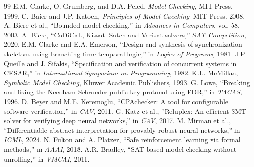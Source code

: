 \documentclass{llncs}
\begin{document}
\begin{thebibliography}{99}
 E.M. Clarke, O. Grumberg, and D.A. Peled, \textit{Model Checking}, MIT Press, 1999.
 C. Baier and J.P. Katoen, \textit{Principles of Model Checking}, MIT Press, 2008.
 A. Biere et al., ``Bounded model checking,'' in \textit{Advances in Computers}, vol. 58, 2003.
 A. Biere, ``CaDiCaL, Kissat, Satch and Varisat solvers,'' \textit{SAT Competition}, 2020.
 E.M. Clarke and E.A. Emerson, ``Design and synthesis of synchronization skeletons using branching time temporal logic,'' in \textit{Logics of Programs}, 1981.
 J.P. Queille and J. Sifakis, ``Specification and verification of concurrent systems in CESAR,'' in \textit{International Symposium on Programming}, 1982.
 K.L. McMillan, \textit{Symbolic Model Checking}, Kluwer Academic Publishers, 1993.
 G. Lowe, ``Breaking and fixing the Needham-Schroeder public-key protocol using FDR,'' in \textit{TACAS}, 1996.
 D. Beyer and M.E. Keremoglu, ``CPAchecker: A tool for configurable software verification,'' in \textit{CAV}, 2011.
 G. Katz et al., ``Reluplex: An efficient SMT solver for verifying deep neural networks,'' in \textit{CAV}, 2017.
 M. Mirman et al., ``Differentiable abstract interpretation for provably robust neural networks,'' in \textit{ICML}, 2024.
 N. Fulton and A. Platzer, ``Safe reinforcement learning via formal methods,'' in \textit{AAAI}, 2018.
 A.R. Bradley, ``SAT-based model checking without unrolling,'' in \textit{VMCAI}, 2011.
\end{thebibliography}
\end{document}
